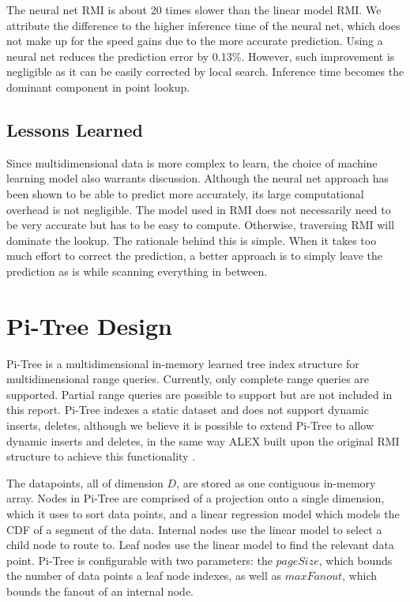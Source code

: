 \documentclass[sigconf,10pt]{acmart}
\begin{document}
The neural net RMI is about 20 times slower than the linear model RMI.
We attribute the difference to the higher inference time of the neural net, which does not make up for
the speed gains due to the more accurate prediction. Using a neural net reduces the prediction
error by 0.13\%. However,
such improvement is negligible as it can be easily corrected by local search. 
Inference time becomes the dominant component in point lookup.

\subsection{Lessons Learned}

Since multidimensional data is more complex to learn, the choice of machine learning model also
warrants discussion. Although the neural net approach has been shown to be able to predict more accurately, its
large computational overhead is not negligible. The model used in RMI does not necessarily need to
be very accurate but has to be easy to compute. Otherwise, traversing RMI will dominate the lookup.
The rationale behind this is simple. When it takes too much effort to correct the prediction, a better
approach is to simply leave the prediction as is while scanning everything in between. 

\section{Pi-Tree Design}

Pi-Tree is a multidimensional in-memory learned tree index structure for
multidimensional range queries. Currently, only complete range queries are supported.
Partial range queries are possible to support but are not included in this report. 
Pi-Tree indexes a static dataset and does not support dynamic inserts, deletes,
although we believe it is possible to extend Pi-Tree to allow dynamic inserts and deletes,
in the same way ALEX built upon the original RMI structure to achieve this functionality \cite{ALEX}.

The datapoints, all of dimension $D$, are stored as one contiguous in-memory array.
Nodes in Pi-Tree are comprised of a projection onto a single dimension, which it uses to
sort data points, and a linear regression model which models the CDF of a segment of the data.
Internal nodes use the linear model to select a child node to route to.
Leaf nodes use the linear model to find the relevant data point. 
Pi-Tree is configurable with two parameters: the $pageSize$, 
which bounds the number of data points
a leaf node indexes, as well as $maxFanout$, which bounds the fanout
of an internal node.
\end{document}
